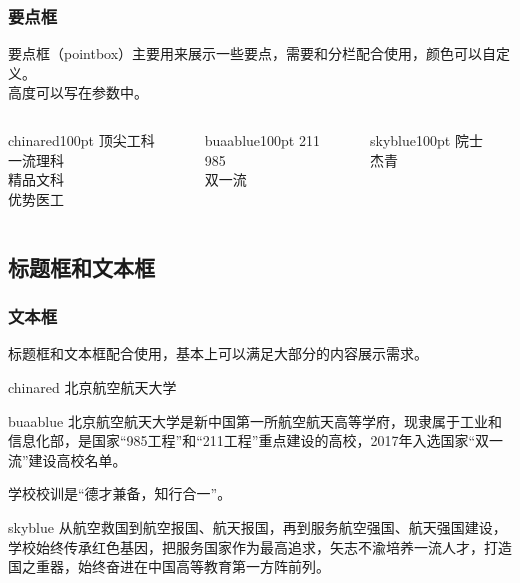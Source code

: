 \documentclass[aspectratio=169,UTF8,t]{beamer}%
\begin{document}
\begin{frame}
    \frametitle{要点框}
    要点框（pointbox）主要用来展示一些要点，需要和分栏配合使用，颜色可以自定义。 \\   
    高度可以写在参数中。  
      \begin{columns}
        \begin{column}{0.3\textwidth}
            \begin{pointbox}[要点一]{chinared}{100pt}
                顶尖工科\\
                一流理科\\
                精品文科\\
                优势医工\\              
            \end{pointbox}
        \end{column}
        \begin{column}{0.3\textwidth}
            \begin{pointbox}[要点二]{buaablue}{100pt}
                211\\
                985\\
                双一流 
            \end{pointbox}            
        \end{column}
        \begin{column}{0.3\textwidth}
            \begin{pointbox}[要点三]{skyblue}{100pt}
                院士\\
                杰青 
            \end{pointbox}
        \end{column}
    \end{columns}    
\end{frame}

\subsection{标题框和文本框}

\begin{frame}
    \frametitle{文本框}
    标题框和文本框配合使用，基本上可以满足大部分的内容展示需求。 \\       
    \begin{headbox}{chinared}
        北京航空航天大学
    \end{headbox}  
    \begin{textbox}{buaablue}
        北京航空航天大学是新中国第一所航空航天高等学府，现隶属于工业和信息化部，是国家“985工程”和“211工程”重点建设的高校，2017年入选国家“双一流”建设高校名单。

        学校校训是“德才兼备，知行合一”。
    \end{textbox}
    \begin{textbox}{skyblue}
        从航空救国到航空报国、航天报国，再到服务航空强国、航天强国建设，学校始终传承红色基因，把服务国家作为最高追求，矢志不渝培养一流人才，打造国之重器，始终奋进在中国高等教育第一方阵前列。
    \end{textbox}
      
\end{frame}
\end{document}
